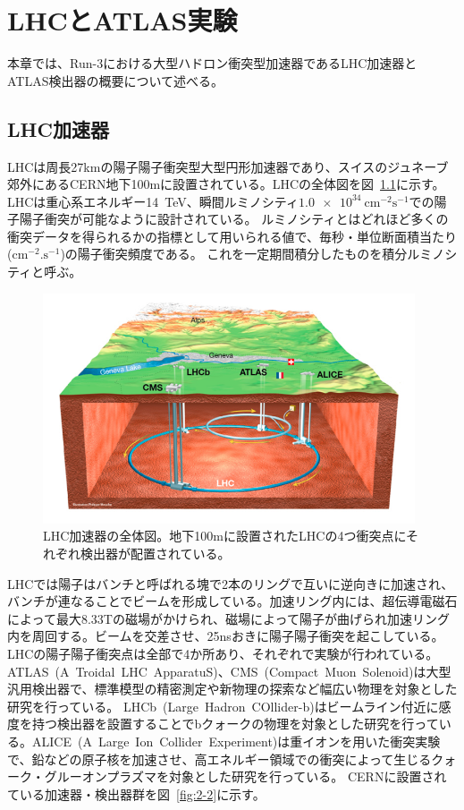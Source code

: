 \chapter{LHCとATLAS実験}\label{chapter2}
本章では、Run-3における大型ハドロン衝突型加速器であるLHC加速器とATLAS検出器の概要について述べる。


\section{LHC加速器}\label{section2-1}
LHCは周長27kmの陽子陽子衝突型大型円形加速器であり、スイスのジュネーブ郊外にあるCERN地下100mに設置されている。LHCの全体図を図~\ref{fig:2-1}に示す。LHCは重心系エネルギー\SI{14}{\tera \electronvolt}、瞬間ルミノシティ$\SI{1.0e34}{\cm^{-2}\s^{-1}}$での陽子陽子衝突が可能なように設計されている。
ルミノシティとはどれほど多くの衝突データを得られるかの指標として用いられる値で、毎秒・単位断面積当たり($\si{\cm^{-2}.\s^{-1}}$)の陽子衝突頻度である。
これを一定期間積分したものを積分ルミノシティと呼ぶ。

\begin{figure}[h]
  \centering
  \includegraphics[clip, width=11cm]{fig/2/lhc_map.jpg}
  \caption{LHC加速器の全体図\cite{article:Overall_view_LHC}。地下100mに設置されたLHCの4つ衝突点にそれぞれ検出器が配置されている。}
  \label{fig:2-1}
\end{figure}

LHCでは陽子はバンチと呼ばれる塊で2本のリングで互いに逆向きに加速され、バンチが連なることでビームを形成している。加速リング内には、超伝導電磁石によって最大8.33Tの磁場がかけられ、磁場によって陽子が曲げられ加速リング内を周回する。ビームを交差させ、25nsおきに陽子陽子衝突を起こしている。
LHCの陽子陽子衝突点は全部で4か所あり、それぞれで実験が行われている。
ATLAS~(A~Troidal~LHC~ApparatuS)、CMS~(Compact~Muon~Solenoid)\cite{article:CMSExperiment}は大型汎用検出器で、標準模型の精密測定や新物理の探索など幅広い物理を対象とした研究を行っている。
LHCb~(Large~Hadron~COllider-b)\cite{article:LHCbExperiment}はビームライン付近に感度を持つ検出器を設置することでbクォークの物理を対象とした研究を行っている。ALICE~(A~Large~Ion~Collider~Experiment)\cite{article:ALICEExperiment}は重イオンを用いた衝突実験で、鉛などの原子核を加速させ、高エネルギー領域での衝突によって生じるクォーク・グルーオンプラズマを対象とした研究を行っている。
CERNに設置されている加速器・検出器群を図~\ref{fig:2-2}に示す。


